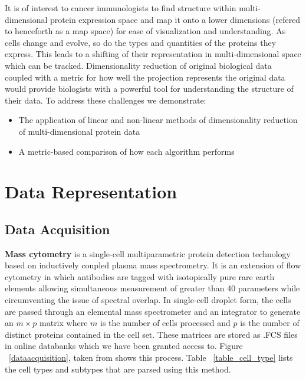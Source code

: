 \documentclass{article}
\begin{document}
It is of interest to cancer immunologists to find structure within multi-dimensional protein expression space and map it onto a lower dimensions (refered to henceforth as a map space) for ease of visualization and understanding. As cells change and evolve, so do the types and quantities of the proteins they express. This leads to a shifting of their representation in multi-dimensional space which can be tracked. Dimensionality reduction of original biological data coupled with a metric for how well the projection represents the original data would provide biologists with a powerful tool for understanding the structure of their data. To address these challenges we demonstrate:

\begin{itemize}
\item The application of linear and non-linear methods of dimensionality reduction of multi-dimensional protein data
\item A metric-based comparison of how each algorithm performs
\end{itemize}

\section{Data Representation}
\label{data_representation}

\subsection{Data Acquisition}

\textbf{Mass cytometry} is a single-cell multiparametric protein detection technology based on inductively coupled plasma mass spectrometry. It is an extension of flow cytometry in which antibodies are tagged with isotopically pure rare earth elements allowing simultaneous measurement of greater than 40 parameters while circumventing the issue of spectral overlap. In single-cell droplet form, the cells are passed through an elemental mass spectrometer and an integrator to generate an $m \times p$ matrix where $m$ is the number of cells processed and $p$ is the number of distinct proteins contained in the cell set. These matrices are stored as .FCS files in online databanks which we have been granted access to. Figure ~\ref{dataacquisition}, taken from \cite{Bendall:2011bm} shows this process. Table ~\ref{table_cell_type} lists the cell types and subtypes that are parsed using this method.
\end{document}
